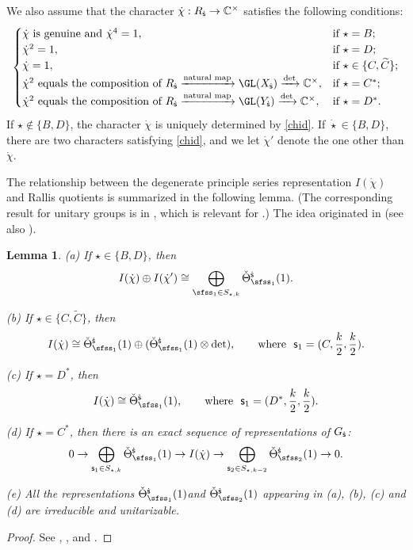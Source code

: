 \documentclass[11pt,a4paper]{amsart}
\newcommand{\be}{\begin {equation}}
\newcommand{\ee}{\end {equation}}
\numberwithin{equation}{section}
\newtheorem{lem}[thm]{Lemma}
\theoremstyle{remark}
\begin{document}
We also assume that the character $\dot \chi: R_{{\dot{\mathsf s}}}\rightarrow \mathbb{C}^\times $
satisfies  the following conditions:
\be\label{chid}
\begin{cases}
 \dot \chi \textrm{ is genuine and $\dot \chi^4=1$,}& \textrm{if $ \star=B$};\\
 \dot \chi^2=1,  & \textrm{if $\star=D$;}\\
 \dot \chi=1,\quad   &\textrm{if } \star\in \{C,\widetilde C\};\\
    \dot \chi^2\textrm{ equals the composition of $R_\dsfss\xrightarrow{\textrm{natural map}} \GL(X_\dsfss)\xrightarrow{\det}\C^\times$},  & \textrm{if $ \star=C^*$;}\\
 \dot \chi^2\textrm{ equals the composition of $R_\dsfss\xrightarrow{\textrm{natural map}} \GL(Y_\dsfss)\xrightarrow{\det}\C^\times$},  & \textrm{if $ \star=D^*$.}
\end{cases}
\ee
If  $\star\notin \{B,D\}$, the character   $\dot{\chi}$ is uniquely determined by \eqref{chid}.
If  $\dot \star\in \{B,D\}$, there are two characters satisfying \eqref{chid}, and we let $\dot \chi'$ denote the one other than $\dot \chi$.


The relationship between the degenerate principle series representation $I(\dot{\chi})$ and
Rallis quotients is summarized in the following lemma. (The corresponding result for unitary groups is in \cite[Introduction]{LZ1}, which is relevant for .)
The idea originated in \cite[Section II]{Ra} (see also \cite{KR}).

\begin{lem}\label{degens}
\noindent
(a) If $\star\in \{B,D\}$,  then
\[
  I(\dot{\chi}) \oplus I(\dot \chi')\cong \bigoplus_{\sfss_1\in S_{\star, k}}
   \check \Theta_{\sfss_1}^{\dsfss}(1).
\]

\noindent
(b) If $\star\in \{C,\widetilde C\}$, then
\[
  I(\dot{\chi})\cong \check \Theta_{\sfss_1}^{\dsfss}(1)\oplus  (\check \Theta_{\sfss_1}^{\dsfss}(1)\otimes \det),\qquad \textrm{where } \ \mathsf s_1=(C, \frac{k}{2}, \frac{k}{2}).
\]


\noindent
(c) If $\star=D^*$, then
\[
  I(\dot{\chi})\cong \check \Theta_{\sfss_1}^{\dsfss}(1),\qquad \textrm{where }\ \mathsf s_1=(D^*,  \frac{k}{2}, \frac{k}{2}).
\]


\noindent
(d) If $\star=C^*$, then there is an exact sequence of representations of $G_{{\dot{\mathsf s}}}$:
\[
0\rightarrow \bigoplus_{\mathsf s_1\in S_{\star, k}} \check \Theta_{\sfss_1}^{\dsfss}(1) \rightarrow
 I(\dot{\chi})\rightarrow  \bigoplus_{\mathsf s_2\in S_{\star, k-2}} \check \Theta_{\sfss_2}^{\dsfss}(1) \rightarrow 0.
\]

\noindent
(e) All the representations $ \check \Theta_{\sfss_1}^{\dsfss}(1) $and $ \check \Theta_{\sfss_2}^{\dsfss}(1)$ appearing in (a), (b), (c) and (d) are irreducible and unitarizable.


\end{lem}
\begin{proof}
 See \cite[Theorem 2.4]{Ku}, \cite[Introduction]{LZ2}, \cite[Theorem 6.1]{LZ3} and  \cite[Sections 9 and 10]{Ya}.
\end{proof}
\end{document}
